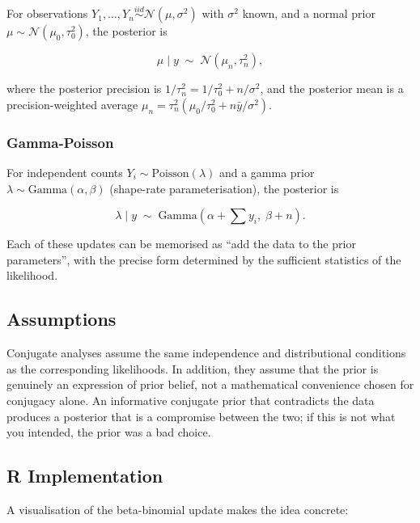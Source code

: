 \documentclass[
]{article}
\begin{document}
For observations
\(Y_1, \ldots, Y_n \overset{iid}{\sim} \mathcal{N}(\mu, \sigma^2)\) with
\(\sigma^2\) known, and a normal prior
\(\mu \sim \mathcal{N}(\mu_0, \tau_0^2)\), the posterior is

\[\mu \mid y \;\sim\; \mathcal{N}(\mu_n, \tau_n^2),\]

where the posterior precision is
\(1/\tau_n^2 = 1/\tau_0^2 + n/\sigma^2\), and the posterior mean is a
precision-weighted average
\(\mu_n = \tau_n^2 (\mu_0/\tau_0^2 + n \bar{y}/\sigma^2)\).

\subsubsection{Gamma-Poisson}\label{gamma-poisson}

For independent counts \(Y_i \sim \text{Poisson}(\lambda)\) and a gamma
prior \(\lambda \sim \text{Gamma}(\alpha, \beta)\) (shape-rate
parameterisation), the posterior is

\[\lambda \mid y \;\sim\; \text{Gamma}\!\left(\alpha + \sum y_i,\; \beta + n\right).\]

Each of these updates can be memorised as ``add the data to the prior
parameters'', with the precise form determined by the sufficient
statistics of the likelihood.

\subsection{Assumptions}\label{assumptions}

Conjugate analyses assume the same independence and distributional
conditions as the corresponding likelihoods. In addition, they assume
that the prior is genuinely an expression of prior belief, not a
mathematical convenience chosen for conjugacy alone. An informative
conjugate prior that contradicts the data produces a posterior that is a
compromise between the two; if this is not what you intended, the prior
was a bad choice.

\subsection{R Implementation}\label{r-implementation}

A visualisation of the beta-binomial update makes the idea concrete:
\end{document}
